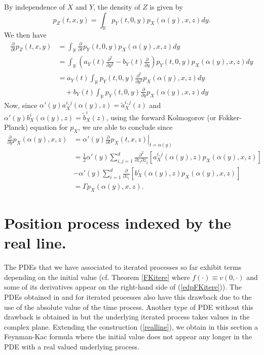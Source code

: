 \documentclass[a4paper, 11pt]{article}
\newcommand{\R}{\mathbb{R}}
\newcommand{\1}{\mathbf{1}}
\begin{document}
 By independence of $X$ and $Y$, the density of $Z$ is given by
$$p_Z(t,x,y)=\int_\R p_Y(t,0,y)p_X(\alpha(y),x,z)dy.$$
We then have
\begin{align*}
\frac{\partial}{\partial t}p_Z(t,x,y)&=\int_\R \frac{\partial}{\partial t}p_Y(t,0,y)p_X(\alpha(y),x,z)dy\\
&=\int_\R \left(a_Y(t)\frac{\partial^2}{\partial y^2}-b_Y(t)\frac{\partial}{\partial y}\right)p_Y(t,0,y)p_X(\alpha(y),x,z)dy\\
&=a_Y(t)\int_\R p_Y(t,0,y)\frac{\partial^2}{\partial y^2}p_X(\alpha(y),x,z)dy\\
&\quad +b_Y(t)\int_\R p_Y(t,0,y)\frac{\partial}{\partial y}p_X(\alpha(y),x,z)dy
\end{align*}
\noindent Now, since $\alpha'(y)a^{i,j}_X(\alpha(y),z)=\tilde{a}^{i,j}_X(z)$ and $\alpha'(y)b^i_X(\alpha(y),z)=\tilde{b}^i_X(z)$, using the forward Kolmogorov (or Fokker-Planck) equation for $p_X$, we are able to conclude since
\begin{align*}
\frac{\partial}{\partial y}p_X(\alpha(y),x,z)&=\alpha'(y)\left.\frac{\partial}{\partial t}p_X(t,x,z)\right|_{t=\alpha(y)}\\
&=\frac{1}{2}\alpha'(y)\sum_{i,j=1}^d\frac{\partial^2}{\partial z_i\partial z_j} \left[a^{i,j}_X(\alpha(y),z)p_X(\alpha(y),x,z)\right]\\
&-\alpha'(y)\sum_{i=1}^d\frac{\partial}{\partial z_i} \left[b^i_X(\alpha(y),z)p_X(\alpha(y),x,z)\right]\\
&=\Gamma p_X(\alpha(y),x,z).
\end{align*}
\hfill \framebox[0.6em]{}






\section{Position process indexed by the real line.}\label{funakipde}

\medskip



\medskip

\noindent The PDEs that we have associated to iterated processes so far exhibit terms depending on the initial value (cf. Theorem \ref{FKitere} where $f(\cdot)\equiv v(0,\cdot)$ and some of its derivatives appear on the right-hand side of (\ref{edpFKitere})). The PDEs obtained in \cite{allouba} and \cite{erkan} for iterated processes also have this drawback due to the use of the absolute value of the time process. Another type of  PDE without this drawback is obtained in \cite{funaki} but the underlying iterated process takes values in the complex plane. Extending the construction (\ref{realline}), we obtain in this section a Feynman-Kac formula where the initial value does not appear any longer in the PDE with a real valued underlying process.
\end{document}
